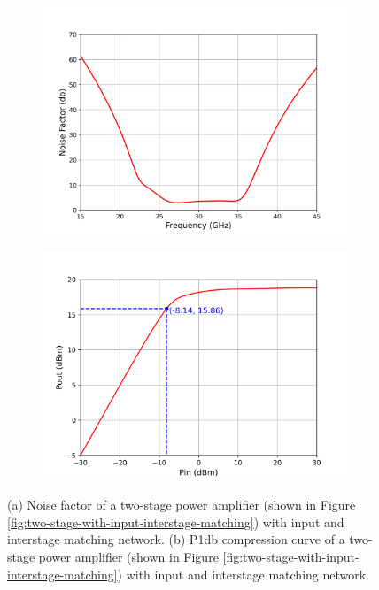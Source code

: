 \begin{figure}[H]
  \centering
  \begin{subfigure}{0.49\textwidth}
    \centering
    \includegraphics[width=\linewidth]{figures/noise-factor.png}
    \caption{}
    \label{fig:noise-factor}
  \end{subfigure}
  \hfill
  \begin{subfigure}{0.49\textwidth}
    \centering
    \includegraphics[width=\linewidth]{figures/compressionCurves.png}
    \caption{}
     \label{fig:compression}
  \end{subfigure}
  \caption{(a) Noise factor of a two-stage power amplifier (shown in Figure \ref{fig:two-stage-with-input-interstage-matching}) with input and interstage matching network. (b) P1db compression curve of a two-stage power amplifier (shown in Figure \ref{fig:two-stage-with-input-interstage-matching}) with input and interstage matching network.}
  \label{fig:two-stage-withmatching-cadence-s11-s12}
\end{figure}

